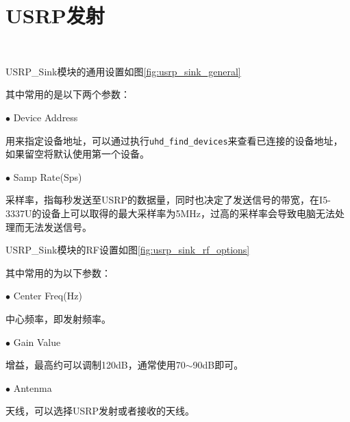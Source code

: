 	\section{USRP发射}
		\begin{figure}[htp]
			\centering
			 \\
		\end{figure}
		\par USRP\_Sink模块的通用设置如图\ref{fig:usrp_sink_general}
		\par 其中常用的是以下两个参数：
		\par $\bullet$ Device Address
		\par 用来指定设备地址，可以通过执行\lstinline[language=sh]{uhd_find_devices}来查看已连接的设备地址，如果留空将默认使用第一个设备。
		\par $\bullet$ Samp Rate(Sps)
		\par 采样率，指每秒发送至USRP的数据量，同时也决定了发送信号的带宽，在I5-3337U的设备上可以取得的最大采样率为5MHz，过高的采样率会导致电脑无法处理而无法发送信号。
		\par USRP\_Sink模块的RF设置如图\ref{fig:usrp_sink_rf_options}
		\par 其中常用的为以下参数：
		\par $\bullet$ Center Freq(Hz)
		\par 中心频率，即发射频率。
		\par $\bullet$ Gain Value
		\par 增益，最高约可以调制120dB，通常使用70$\sim$90dB即可。
		\par $\bullet$ Antenma
		\par 天线，可以选择USRP发射或者接收的天线。
